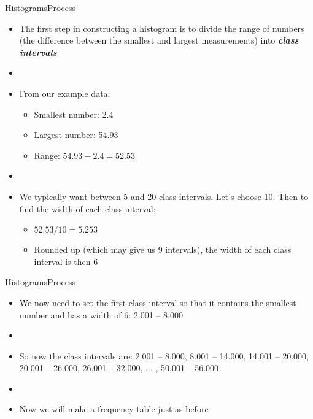 \documentclass[xcolor=dvipsnames]{beamer}
\begin{document}
\begin{frame}{Histograms}{Process}
	\begin{itemize}
		\item The first step in constructing a histogram is to divide the range of numbers (the difference between the smallest and largest measurements) into \textbf{\emph{class intervals}} \pause
		\item[]
		\item From our example data: \pause
		\begin{itemize}
			\item Smallest number: 2.4 \pause
			\item Largest number: 54.93 \pause
			\item Range: $54.93 - 2.4 = 52.53$ \pause
		\end{itemize}	
		\item[]
		\item We typically want between 5 and 20 class intervals. Let's choose 10. Then to find the width of each class interval: \pause
		\begin{itemize}
			\item $52.53 / 10 = 5.253$ \pause
			\item Rounded up (which may give us 9 intervals), the width of each class interval is then 6
		\end{itemize}
	\end{itemize}
\end{frame}

\begin{frame}{Histograms}{Process}
	\begin{itemize}
		\item We now need to set the first class interval so that it contains the smallest number and has a width of 6: 2.001 -- 8.000 \pause
		\item[]
		\item So now the class intervals are: 2.001 -- 8.000, 8.001 -- 14.000, 14.001 -- 20.000, 20.001 -- 26.000, 26.001 -- 32.000, ... , 50.001 -- 56.000 \pause
		\item[]
		\item Now we will make a frequency table just as before 
	\end{itemize}
\end{frame}
\end{document}
